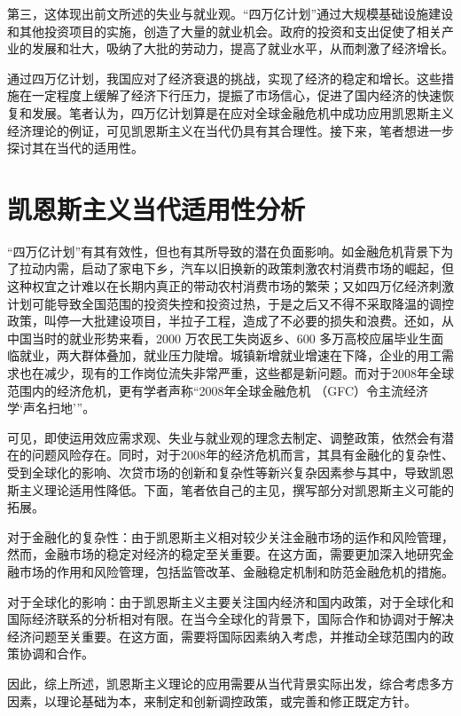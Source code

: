 \documentclass[UTF8,openany]{ctexbook}
\begin{document}
第三，这体现出前文所述的失业与就业观。“四万亿计划”通过大规模基础设施建设和其他投资项目的实施，创造了大量的就业机会。政府的投资和支出促使了相关产业的发展和壮大，吸纳了大批的劳动力，提高了就业水平，从而刺激了经济增长。

通过四万亿计划，我国应对了经济衰退的挑战，实现了经济的稳定和增长。这些措施在一定程度上缓解了经济下行压力，提振了市场信心，促进了国内经济的快速恢复和发展。笔者认为，四万亿计划算是在应对全球金融危机中成功应用凯恩斯主义经济理论的例证，可见凯恩斯主义在当代仍具有其合理性。接下来，笔者想进一步探讨其在当代的适用性。

\chapter{凯恩斯主义当代适用性分析}
\thispagestyle{fancy}
“四万亿计划”有其有效性，但也有其所导致的潜在负面影响。如金融危机背景下为了拉动内需，启动了家电下乡，汽车以旧换新的政策刺激农村消费市场的崛起，但这种权宜之计难以在长期内真正的带动农村消费市场的繁荣；又如四万亿经济刺激计划可能导致全国范围的投资失控和投资过热，于是之后又不得不采取降温的调控政策，叫停一大批建设项目，半拉子工程，造成了不必要的损失和浪费。\cite{bi:2}还如，从中国当时的就业形势来看，2000 万农民工失岗返乡、600 多万高校应届毕业生面临就业，两大群体叠加，就业压力陡增。城镇新增就业增速在下降，企业的用工需求也在减少，现有的工作岗位流失非常严重，这些都是新问题。\cite{bi:5}而对于2008年全球范围内的经济危机，更有学者声称“2008年全球金融危机 （GFC）令主流经济学‘声名扫地’”。\cite{bi:6}

可见，即使运用效应需求观、失业与就业观的理念去制定、调整政策，依然会有潜在的问题风险存在。同时，对于2008年的经济危机而言，其具有金融化的复杂性、受到全球化的影响、次贷市场的创新和复杂性等新兴复杂因素参与其中，导致凯恩斯主义理论适用性降低。下面，笔者依自己的主见，撰写部分对凯恩斯主义可能的拓展。

对于金融化的复杂性：由于凯恩斯主义相对较少关注金融市场的运作和风险管理，然而，金融市场的稳定对经济的稳定至关重要。在这方面，需要更加深入地研究金融市场的作用和风险管理，包括监管改革、金融稳定机制和防范金融危机的措施。

对于全球化的影响：由于凯恩斯主义主要关注国内经济和国内政策，对于全球化和国际经济联系的分析相对有限。在当今全球化的背景下，国际合作和协调对于解决经济问题至关重要。在这方面，需要将国际因素纳入考虑，并推动全球范围内的政策协调和合作。

因此，综上所述，凯恩斯主义理论的应用需要从当代背景实际出发，综合考虑多方因素，以理论基础为本，来制定和创新调控政策，或完善和修正既定方针。
\end{document}
